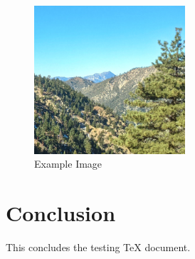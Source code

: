 \documentclass{article}
\begin{document}
    \begin{figure}[h]
        \centering
        \includegraphics[width=0.5\textwidth]{example-image.png}
        \caption{Example Image}
    \end{figure}

    \section{Conclusion}

    This concludes the testing TeX document.
\end{document}
